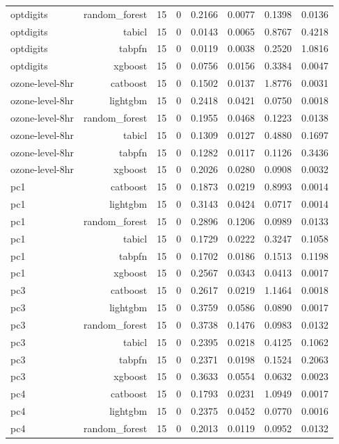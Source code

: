 \begin{table}[htbp]
\begin{tabular}{lrrrrrrr}
optdigits & random\_forest & 15 & 0 & 0.2166 & 0.0077 & 0.1398 & 0.0136 \\
optdigits & tabicl & 15 & 0 & 0.0143 & 0.0065 & 0.8767 & 0.4218 \\
optdigits & tabpfn & 15 & 0 & 0.0119 & 0.0038 & 0.2520 & 1.0816 \\
optdigits & xgboost & 15 & 0 & 0.0756 & 0.0156 & 0.3384 & 0.0047 \\
ozone-level-8hr & catboost & 15 & 0 & 0.1502 & 0.0137 & 1.8776 & 0.0031 \\
ozone-level-8hr & lightgbm & 15 & 0 & 0.2418 & 0.0421 & 0.0750 & 0.0018 \\
ozone-level-8hr & random\_forest & 15 & 0 & 0.1955 & 0.0468 & 0.1223 & 0.0138 \\
ozone-level-8hr & tabicl & 15 & 0 & 0.1309 & 0.0127 & 0.4880 & 0.1697 \\
ozone-level-8hr & tabpfn & 15 & 0 & 0.1282 & 0.0117 & 0.1126 & 0.3436 \\
ozone-level-8hr & xgboost & 15 & 0 & 0.2026 & 0.0280 & 0.0908 & 0.0032 \\
pc1 & catboost & 15 & 0 & 0.1873 & 0.0219 & 0.8993 & 0.0014 \\
pc1 & lightgbm & 15 & 0 & 0.3143 & 0.0424 & 0.0717 & 0.0014 \\
pc1 & random\_forest & 15 & 0 & 0.2896 & 0.1206 & 0.0989 & 0.0133 \\
pc1 & tabicl & 15 & 0 & 0.1729 & 0.0222 & 0.3247 & 0.1058 \\
pc1 & tabpfn & 15 & 0 & 0.1702 & 0.0186 & 0.1513 & 0.1198 \\
pc1 & xgboost & 15 & 0 & 0.2567 & 0.0343 & 0.0413 & 0.0017 \\
pc3 & catboost & 15 & 0 & 0.2617 & 0.0219 & 1.1464 & 0.0018 \\
pc3 & lightgbm & 15 & 0 & 0.3759 & 0.0586 & 0.0890 & 0.0017 \\
pc3 & random\_forest & 15 & 0 & 0.3738 & 0.1476 & 0.0983 & 0.0132 \\
pc3 & tabicl & 15 & 0 & 0.2395 & 0.0218 & 0.4125 & 0.1062 \\
pc3 & tabpfn & 15 & 0 & 0.2371 & 0.0198 & 0.1524 & 0.2063 \\
pc3 & xgboost & 15 & 0 & 0.3633 & 0.0554 & 0.0632 & 0.0023 \\
pc4 & catboost & 15 & 0 & 0.1793 & 0.0231 & 1.0949 & 0.0017 \\
pc4 & lightgbm & 15 & 0 & 0.2375 & 0.0452 & 0.0770 & 0.0016 \\
pc4 & random\_forest & 15 & 0 & 0.2013 & 0.0119 & 0.0952 & 0.0132 \\

\end{tabular}
\end{table}
